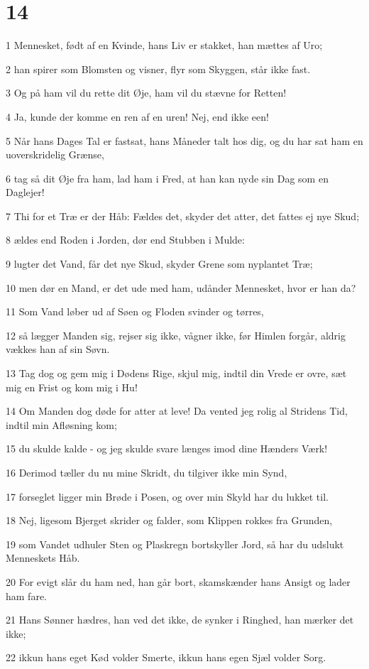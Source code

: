 \chapter{14}

\par 1 Mennesket, født af en Kvinde, hans Liv er stakket, han mættes af Uro;
\par 2 han spirer som Blomsten og visner, flyr som Skyggen, står ikke fast.
\par 3 Og på ham vil du rette dit Øje, ham vil du stævne for Retten!
\par 4 Ja, kunde der komme en ren af en uren! Nej, end ikke een!
\par 5 Når hans Dages Tal er fastsat, hans Måneder talt hos dig, og du har sat ham en uoverskridelig Grænse,
\par 6 tag så dit Øje fra ham, lad ham i Fred, at han kan nyde sin Dag som en Daglejer!
\par 7 Thi for et Træ er der Håb: Fældes det, skyder det atter, det fattes ej nye Skud;
\par 8 ældes end Roden i Jorden, dør end Stubben i Mulde:
\par 9 lugter det Vand, får det nye Skud, skyder Grene som nyplantet Træ;
\par 10 men dør en Mand, er det ude med ham, udånder Mennesket, hvor er han da?
\par 11 Som Vand løber ud af Søen og Floden svinder og tørres,
\par 12 så lægger Manden sig, rejser sig ikke, vågner ikke, før Himlen forgår, aldrig vækkes han af sin Søvn.
\par 13 Tag dog og gem mig i Dødens Rige, skjul mig, indtil din Vrede er ovre, sæt mig en Frist og kom mig i Hu!
\par 14 Om Manden dog døde for atter at leve! Da vented jeg rolig al Stridens Tid, indtil min Afløsning kom;
\par 15 du skulde kalde - og jeg skulde svare længes imod dine Hænders Værk!
\par 16 Derimod tæller du nu mine Skridt, du tilgiver ikke min Synd,
\par 17 forseglet ligger min Brøde i Posen, og over min Skyld har du lukket til.
\par 18 Nej, ligesom Bjerget skrider og falder, som Klippen rokkes fra Grunden,
\par 19 som Vandet udhuler Sten og Plaskregn bortskyller Jord, så har du udslukt Menneskets Håb.
\par 20 For evigt slår du ham ned, han går bort, skamskænder hans Ansigt og lader ham fare.
\par 21 Hans Sønner hædres, han ved det ikke, de synker i Ringhed, han mærker det ikke;
\par 22 ikkun hans eget Kød volder Smerte, ikkun hans egen Sjæl volder Sorg.

